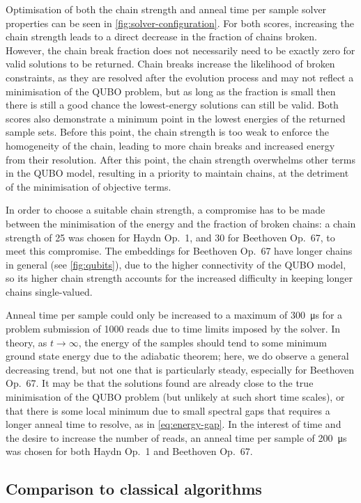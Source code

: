 \documentclass[twocolumn]{article}
\theoremstyle{definition}
\begin{document}
Optimisation of both the chain strength and anneal time per sample solver properties can be seen in \cref{fig:solver-configuration}. For both scores, increasing the chain strength leads to a direct decrease in the fraction of chains broken. However, the chain break fraction does not necessarily need to be exactly zero for valid solutions to be returned. Chain breaks increase the likelihood of broken constraints, as they are resolved after the evolution process and may not reflect a minimisation of the QUBO problem, but as long as the fraction is small then there is still a good chance the lowest-energy solutions can still be valid. Both scores also demonstrate a minimum point in the lowest energies of the returned sample sets. Before this point, the chain strength is too weak to enforce the homogeneity of the chain, leading to more chain breaks and increased energy from their resolution. After this point, the chain strength overwhelms other terms in the QUBO model, resulting in a priority to maintain chains, at the detriment of the minimisation of objective terms.

In order to choose a suitable chain strength, a compromise has to be made between the minimisation of the energy and the fraction of broken chains: a chain strength of \num{25} was chosen for Haydn Op.\ 1, and \num{30} for Beethoven Op.\ 67, to meet this compromise. The embeddings for Beethoven Op.\ 67 have longer chains in general (see \cref{fig:qubits}), due to the higher connectivity of the QUBO model, so its higher chain strength accounts for the increased difficulty in keeping longer chains single-valued.

Anneal time per sample could only be increased to a maximum of \qty{300}{\us} for a problem submission of \num{1000} reads due to time limits imposed by the solver. In theory, as $t\to\infty$, the energy of the samples should tend to some minimum ground state energy due to the adiabatic theorem; here, we do observe a general decreasing trend, but not one that is particularly steady, especially for Beethoven Op.\ 67. It may be that the solutions found are already close to the true minimisation of the QUBO problem (but unlikely at such short time scales), or that there is some local minimum due to small spectral gaps that requires a longer anneal time to resolve, as in \cref{eq:energy-gap}. In the interest of time and the desire to increase the number of reads, an anneal time per sample of \qty{200}{\us} was chosen for both Haydn Op.\ 1 and Beethoven Op.\ 67.

\subsection{Comparison to classical algorithms}
\end{document}
